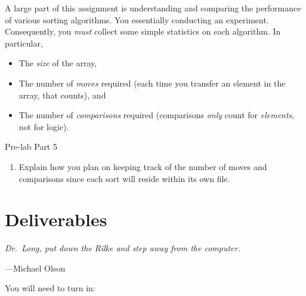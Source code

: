 \documentclass[11pt]{article}
\begin{document}
A large part of this assignment is understanding and comparing the performance
of various sorting algorithms. You essentially conducting an experiment. Consequently, you \emph{must} collect some simple
statistics on each algorithm. In particular,
\begin{itemize}
\item The \emph{size} of the array,
\item The number of \emph{moves} required (each time you transfer an element
in the array, that counts), and
\item The number of \emph{comparisons} required (comparisons \emph{only} count
	for \emph{elements}, not for logic).
\end{itemize}

\medskip
\begin{prelab}{Pre-lab Part 5}
    \begin{enumerate}
        \item Explain how you plan on keeping track of the number of moves and comparisons since
	      each sort will reside within its own file.
    \end{enumerate}
\end{prelab}


\section{Deliverables}
\epigraph{\emph{Dr.\ Long, put down the Rilke and step away from the
computer.}}{---Michael Olson}

You will need to turn in:
\end{document}
